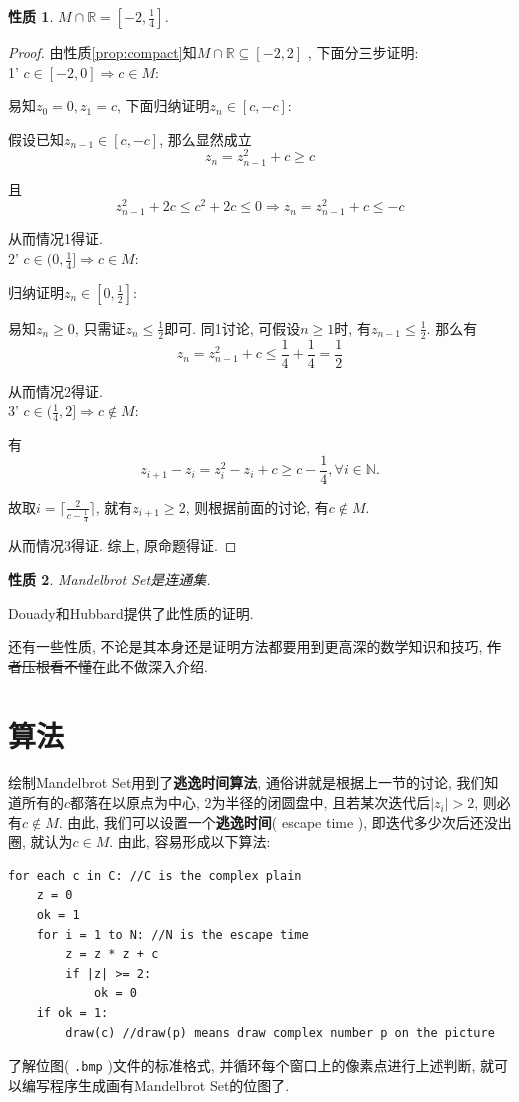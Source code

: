 \documentclass{ctexart}
\newtheorem{property}{性质}
\begin{document}
\begin{property}
$M \cap \mathbb{R} = [-2, \frac{1}{4}]$.
\end{property}
\begin{proof}
由性质\ref{prop:compact}知$M \cap \mathbb{R} \subseteq [-2, 2]$ , 下面分三步证明: \\
1' $c \in [-2, 0] \Rightarrow c \in M$: 
\par 易知$z_0=0, z_1=c$, 下面归纳证明$z_n \in [c, -c]$:
\par 假设已知$z_{n-1} \in [c, -c]$, 那么显然成立
$$z_n = z_{n-1}^2+c \ge c$$
\par 且
$$z_{n-1}^2+2c \le c^2+2c \le 0 \Rightarrow z_n = z_{n-1}^2+c \le -c$$
\par 从而情况1得证. \\
2' $c \in (0, \frac{1}{4}] \Rightarrow c \in M$:
\par 归纳证明$z_n \in [0, \frac{1}{2}]$:
\par 易知$z_n \ge 0$, 只需证$z_n \le \frac{1}{2}$即可. 同1讨论, 可假设$n \ge 1$时, 有$z_{n-1} \le \frac{1}{2}$. 那么有
$$z_n=z_{n-1}^2+c \le \frac{1}{4}+\frac{1}{4} = \frac{1}{2}$$
\par 从而情况2得证. \\
3' $c \in (\frac{1}{4}, 2] \Rightarrow c \notin M$:
\par 有
$$z_{i+1}-z_i = z_i^2-z_i+c \ge c-\frac{1}{4}, \forall i \in \mathbb{N}.$$
\par 故取$i=\lceil \frac{2}{c-\frac{1}{4}} \rceil$, 就有$z_{i+1} \ge 2$, 则根据前面的讨论, 有$c \notin M$.
\par 从而情况3得证. 综上, 原命题得证.
\end{proof}

\begin{property}
Mandelbrot Set是连通集.
\end{property}
\par Douady和Hubbard提供了此性质的证明.

\par 还有一些性质, 不论是其本身还是证明方法都要用到更高深的数学知识和技巧, \sout{作者压根看不懂}在此不做深入介绍.

\section{算法}
绘制Mandelbrot Set用到了\textbf{逃逸时间算法}, 通俗讲就是根据上一节的讨论, 我们知道所有的$c$都落在以原点为中心, 2为半径的闭圆盘中, 且若某次迭代后$|z_i| > 2$, 则必有$c \notin M$. 由此, 我们可以设置一个\textbf{逃逸时间}( escape time ), 即迭代多少次后还没出圈, 就认为$c \in M$. 由此, 容易形成以下算法:
\begin{verbatim}
for each c in C: //C is the complex plain
    z = 0
    ok = 1
    for i = 1 to N: //N is the escape time
        z = z * z + c
        if |z| >= 2:
            ok = 0
    if ok = 1:
        draw(c) //draw(p) means draw complex number p on the picture
\end{verbatim}
\par 了解位图( \verb!.bmp! )文件的标准格式, 并循环每个窗口上的像素点进行上述判断, 就可以编写程序生成画有Mandelbrot Set的位图了.
\end{document}
